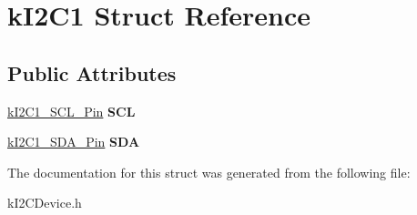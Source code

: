 \hypertarget{structkI2C1}{}\section{k\+I2\+C1 Struct Reference}
\label{structkI2C1}
\subsection*{Public Attributes}
\begin{DoxyCompactItemize}
\item 
\hyperlink{structkI2C1__SCL__Pin}{k\+I2\+C1\+\_\+\+S\+C\+L\+\_\+\+Pin} {\bfseries S\+CL}\hypertarget{structkI2C1_a894fe85cdf7fe9e0e19e5cd3290d14d8}{}\label{structkI2C1_a894fe85cdf7fe9e0e19e5cd3290d14d8}

\item 
\hyperlink{structkI2C1__SDA__Pin}{k\+I2\+C1\+\_\+\+S\+D\+A\+\_\+\+Pin} {\bfseries S\+DA}\hypertarget{structkI2C1_a8bd66305d8f3348af513e8d50140e4d9}{}\label{structkI2C1_a8bd66305d8f3348af513e8d50140e4d9}

\end{DoxyCompactItemize}


The documentation for this struct was generated from the following file\+:\begin{DoxyCompactItemize}
\item 
k\+I2\+C\+Device.\+h\end{DoxyCompactItemize}
